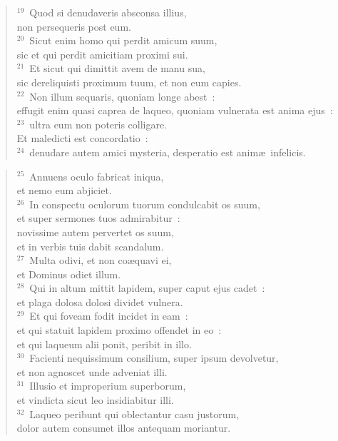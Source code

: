 \begin{flushleft}
\begin{verse}
${}^{19}$~Quod si denudaveris absconsa illius,\\ non persequeris post eum.\\
${}^{20}$~Sicut enim homo qui perdit amicum suum,\\ sic et qui perdit amicitiam proximi sui.\\
${}^{21}$~Et sicut qui dimittit avem de manu sua,\\ sic dereliquisti proximum tuum, et non eum capies.\\
${}^{22}$~Non illum sequaris, quoniam longe abest~:\\ effugit enim quasi caprea de laqueo, quoniam vulnerata est anima ejus~:\\
${}^{23}$~ultra eum non poteris colligare.\\ Et maledicti est concordatio~:\\
${}^{24}$~denudare autem amici mysteria, desperatio est anim\ae\ infelicis.\end{verse}\end{flushleft}


\begin{flushleft}\begin{verse}${}^{25}$~Annuens oculo fabricat iniqua,\\ et nemo eum abjiciet.\\
${}^{26}$~In conspectu oculorum tuorum condulcabit os suum,\\ et super sermones tuos admirabitur~:\\ novissime autem pervertet os suum,\\ et in verbis tuis dabit scandalum.\\
${}^{27}$~Multa odivi, et non co\ae quavi ei,\\ et Dominus odiet illum.\\
${}^{28}$~Qui in altum mittit lapidem, super caput ejus cadet~:\\ et plaga dolosa dolosi dividet vulnera.\\
${}^{29}$~Et qui foveam fodit incidet in eam~:\\ et qui statuit lapidem proximo offendet in eo~:\\ et qui laqueum alii ponit, peribit in illo.\\
${}^{30}$~Facienti nequissimum consilium, super ipsum devolvetur,\\ et non agnoscet unde adveniat illi.\\
${}^{31}$~Illusio et improperium superborum,\\ et vindicta sicut leo insidiabitur illi.\\
${}^{32}$~Laqueo peribunt qui oblectantur casu justorum,\\ dolor autem consumet illos antequam moriantur.\end{verse}\end{flushleft}



